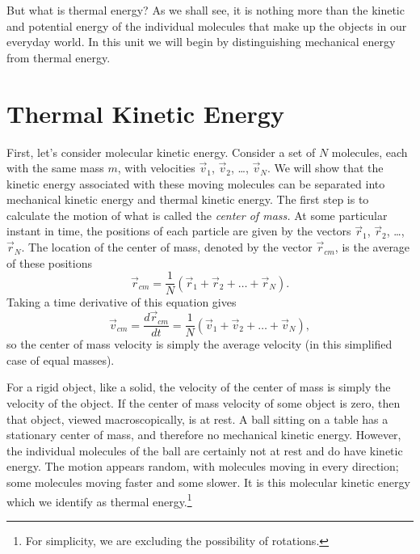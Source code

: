 But what is thermal energy?  As we shall see, it is nothing more than
the kinetic and potential energy of the individual molecules that make
up the objects in our everyday world.  In this unit we will begin by
distinguishing mechanical energy from thermal energy.

\section{Thermal Kinetic Energy}

\label{section:thermal_kinetic_energy}

First, let's consider molecular kinetic energy.  Consider a set of $N$
molecules, each with the same mass $m$, with velocities $\vec v_1$,
$\vec v_2$, \dots, $\vec v_N$.  We will show that the kinetic energy
associated with these moving molecules can be separated into
mechanical kinetic energy and thermal kinetic energy.  The first step
is to calculate the motion of what is called the {\it center of mass.}
At some particular instant in time, the positions of each particle are
given by the vectors $\vec r_1$, $\vec r_2$, \dots, $\vec r_N$.  The
location of the center of mass, denoted by the vector $\vec r_{cm}$,
is the average of these positions
\begin{equation}
\vec r_{cm} = \frac{1}{N}(\vec r_1 + \vec r_2 + \dots + \vec r_N).
\end{equation}
Taking a time derivative of this equation gives
\begin{equation}
\vec v_{cm} = \frac{d\vec r_{cm}}{dt} =
\frac{1}{N}(\vec v_1 + \vec v_2 + \dots + \vec v_N),
\end{equation}
so the center of mass velocity is simply the average velocity (in this
simplified case of equal masses).  

For a rigid object, like a solid, the velocity of the center of mass
is simply the velocity of the object.  If the center of mass velocity
of some object is zero, then that object, viewed macroscopically, is at
rest.  A ball sitting on a table has a stationary center of mass, and
therefore no mechanical kinetic energy.  However, the individual
molecules of the ball are certainly not at rest and do have kinetic
energy.  The motion appears random, with molecules moving in every
direction; some molecules moving faster and some slower.  It is this
molecular kinetic energy which we identify as thermal
energy.\footnote{For simplicity, we are excluding the possibility of
  rotations.}


